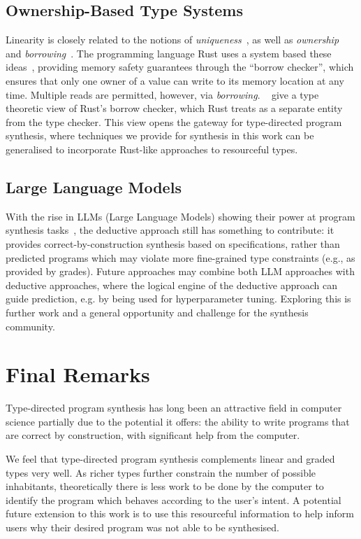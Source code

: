 \subsection{Ownership-Based Type Systems}
Linearity is closely related to the notions of
\emph{uniqueness}~\citep{10.1007/3-540-57529-4_42, 10.1007/3-540-57787-4_23}, as
well as \emph{ownership} and \textit{borrowing}~\citep{Mycroft2013}. The
programming language Rust uses a system based these
ideas~\citep{10.1145/2692956.2663188, 10.1145/3158154, jung2019stacked}, providing memory safety
guarantees through the ``borrow checker'', which ensures that only one owner of
a value can write to its memory location at any time. Multiple reads are
permitted, however, via \textit{borrowing}. ~\citet{DBLP:conf/esop/MarshallVO22}
give a type theoretic view of Rust's borrow checker, which Rust treats as a
separate entity from the type checker. This view opens the gateway for
type-directed program synthesis, where techniques we provide for synthesis in
this work can be generalised to incorporate Rust-like approaches to resourceful
types. 

\subsection{Large Language Models}
With the rise in LLMs (Large Language Models) showing their power at program
synthesis tasks~\citep{DBLP:journals/corr/abs-2108-07732,jain2021jigsaw}, the
deductive approach still has something to contribute: it provides
correct-by-construction synthesis based on specifications, rather than predicted
programs which may violate more fine-grained type constraints (e.g., as provided
by grades). Future approaches may combine both LLM approaches with deductive
approaches, where the logical engine of the deductive approach can guide
prediction, e.g. by being used for hyperparameter tuning. Exploring this is
further work and a general opportunity and challenge for the synthesis
community.


\section{Final Remarks}
Type-directed program synthesis has long been an attractive field in
computer science partially due to the potential it offers: the ability to write
programs that are correct by construction, with significant help from the
computer. 

We feel that type-directed program synthesis complements linear and graded types
very well. As richer types further constrain the number of possible inhabitants,
theoretically there is less work to be done by the computer to identify the
program which behaves according to the user's intent. A potential future
extension to this work is to use this resourceful information to help inform
users why their desired program was not able to be synthesised. 

